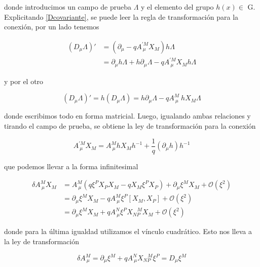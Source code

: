 \documentclass{article}
\numberwithin{equation}{section}
\begin{document}
donde introducimos un campo de prueba $ \Lambda $ y el elemento del grupo $ h(x) \in $ G. Explicitando \ref{Dcovariante}, se puede leer la regla de transformación para 
la conexión, por un lado tenemos

\begin{equation}
\begin{aligned}
\left(D_{\mu} \Lambda\right)' &= \left( \partial_{\mu} - q A^{'M}_{\ \mu} X_M\right) h \Lambda\\
&= \partial_{\mu} h \Lambda + h \partial_{\mu} \Lambda - q A^{'M}_{\ \mu} X_M h \Lambda
\end{aligned}
\end{equation}

y por el otro

\begin{equation}
\left(D_{\mu} \Lambda\right)' = h \left(D_{\mu} \Lambda\right) = h\partial_{\mu}\Lambda - q A^M_{\ \mu} \ h X_M \Lambda
\end{equation}

donde escribimos todo en forma matricial. Luego, igualando ambas relaciones y tirando el campo de prueba, se obtiene la ley de transformación para la conexión

\begin{equation}
A^{'M}_{\ \mu} X_M = A^M_{\ \mu} h X_M h^{-1} + \frac{1}{q} \left( \partial_{\mu} h\right)h^{-1}
\end{equation}

que podemos llevar a la forma infinitesimal

\begin{equation}
\begin{aligned}
\delta A^M_{\ \mu} X_M &= A^M_{\ \mu} \left( q \xi^P X_P X_M -q X_M \xi^P X_P \right)  + \partial_{\mu} \xi^M X_M + \mathcal{O}(\xi^2)\\
&= \partial_{\mu} \xi^M X_M - q A^M_{\ \mu} \xi^P \left[X_M, X_P\right] + \mathcal{O}(\xi^2)\\
&= \partial_{\mu} \xi^M X_M + q A^N_{\ \mu} \xi^P X_{N P}^{\ \ \ \ M} X_M + \mathcal{O}(\xi^2)
\end{aligned}
\end{equation}

donde para la última igualdad utilizamos el vínculo cuadrático. Esto nos lleva a la ley de transformación

\begin{boxquation}
\begin{equation}\label{deltaA}
\delta A^M_{\ \mu} = \partial_{\mu} \xi^M + q A^N_{\ \mu} X_{N P}^{\ \ \ \ M} \xi^P = D_{\mu} \xi^M 
\end{equation}
\end{boxquation}
\end{document}
